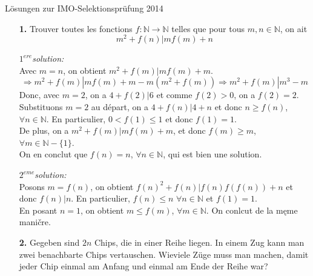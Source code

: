 \documentclass[12pt,a4paper]{article}
\theoremstyle{plain}
\theoremstyle{definition}
\theoremstyle{remark}
\begin{document}
\pagestyle{empty}

\begin{center}
{\huge Lösungen zur IMO-Selektionsprüfung 2014} \\
\end{center}
\vspace{8mm}

\begin{enumerate}
     \item[\textbf{1.}]Trouver toutes les fonctions $f: \mathbb{N}\to \mathbb{N}$ telles que pour tous $m,n\in \mathbb{N}$, on ait
\[
m^2+f(n)|mf(m)+n
\]

\textit{$1^{ere}$solution:}\\
Avec $m=n$, on obtient $m^2+f(m)|mf(m)+m$.
\[\Rightarrow m^2+f(m)|mf(m)+m -m(m^2+f(m)) \Rightarrow m^2+f(m)|m^3-m\]
Donc, avec $m=2$, on a $4+f(2)|6$ et comme $f(2)>0$, on a $f(2)=2$.\\
Substituons $m=2$ au départ, on a $4+f(n)|4+n$ et donc $n \geq f(n)$, $\forall n \in \mathbb{N}$. 
En particulier, $0<f(1)\leq 1$ et donc $f(1)=1.$\\
De plus, on a $m^2+f(m)|mf(m)+m$, et donc $f(m) \geq m$, $\forall m \in \mathbb{N}-\{1\}$.\\
On en conclut que $f(n)=n$, $\forall n \in \mathbb{N}$, qui est bien une solution.

\textit{$2^{eme}$solution:}\\
Posons $m=f(n)$, on obtient $f(n)^2 +f(n) | f(n)f(f(n)) + n$ et donc $f(n)|n$. 
En particulier, $f(n)\leq n$ $\forall n \in \mathbb{N}$ et $f(1)=1$.\\
En posant $n=1$, on obtient $m \leq f(m)$,  $\forall m \in \mathbb{N}$.
On conlcut de la męme maničre.

	
\item[\textbf{2.}] Gegeben sind $2n$ Chips, die in einer Reihe liegen. In einem Zug kann man zwei benachbarte Chips vertauschen. Wieviele Züge muss man machen, damit jeder Chip einmal am Anfang und einmal am Ende der Reihe war?\\
	

\end{enumerate}
\end{document}
